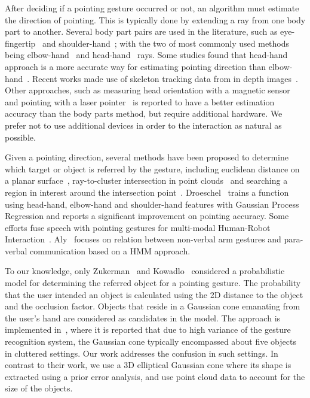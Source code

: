 After deciding if a pointing gesture occurred or not, an algorithm must estimate the direction of pointing. This is typically done by extending a ray from one body part to another. Several body part pairs are used in the literature, such as eye-fingertip~\cite{kehl2004real} and shoulder-hand~\cite{hosoya2004arm}; with the two of most commonly used methods being elbow-hand~\cite{raza2013human, brooks2006working, blodow2011inferring} and head-hand~\cite{bennewitz2008robust, schmidt2008interacting} rays. Some studies found that head-hand approach is a more accurate way for estimating pointing direction than elbow-hand~\cite{quintero2013sepo, droeschel2011towards}. Recent works made use of skeleton tracking data from in depth images~\cite{quintero2013sepo, blodow2011inferring, raza2013human}. Other approaches, such as measuring head orientation with a magnetic sensor~\cite{nickel2003pointing} and pointing with a laser pointer~\cite{cheng2009hand, kemp2008point} is reported to have a better estimation accuracy than the body parts method, but require additional hardware. We prefer not to use additional devices in order to the interaction as natural as possible.

Given a pointing direction, several methods have been proposed to determine which target or object is referred by the gesture, including euclidean distance on a planar surface~\cite{cheng2009hand}, ray-to-cluster intersection in point clouds~\cite{blodow2011inferring, quintero2013sepo} and searching a region in interest around the intersection point~\cite{schmidt2008interacting}. Droeschel~\cite{droeschel2011learning} trains a function using head-hand, elbow-hand and shoulder-hand features with Gaussian Process Regression and reports a significant improvement on pointing accuracy. Some efforts fuse speech with pointing gestures for multi-modal Human-Robot Interaction~\cite{aly2012integrated,kowadlo2010influence}. Aly~\cite{aly2012integrated} focuses on relation between non-verbal arm gestures and para-verbal communication based on a HMM approach.

To our knowledge, only Zukerman~\cite{zukerman2011speaking} and Kowadlo~\cite{kowadlo2010influence} considered a probabilistic model for determining the referred object for a pointing gesture. The probability that the user intended an object is calculated using the 2D distance to the object and the occlusion factor. Objects that reside in a Gaussian cone emanating from the user's hand are considered as candidates in the model. The approach is implemented in~\cite{zukerman2011speaking}, where it is reported that due to high variance of the gesture recognition system, the Gaussian cone typically encompassed about five objects in cluttered settings. Our work addresses the confusion in such settings. In contrast to their work, we use a 3D elliptical Gaussian cone where its shape is extracted using a prior error analysis, and use point cloud data to account for the size of the objects.

